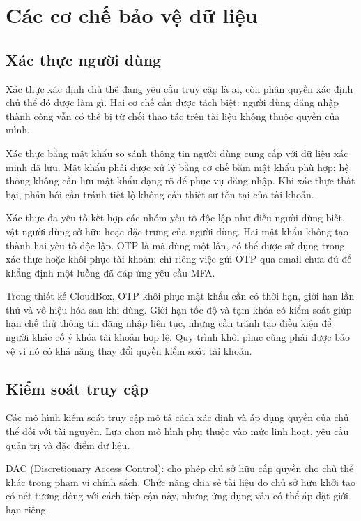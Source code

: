 \section{Các cơ chế bảo vệ dữ liệu}
\subsection{Xác thực người dùng}
Xác thực xác định chủ thể đang yêu cầu truy cập là ai, còn phân quyền xác định chủ thể đó được làm gì. Hai cơ chế cần được tách biệt: người dùng đăng nhập thành công vẫn có thể bị từ chối thao tác trên tài liệu không thuộc quyền của mình.

Xác thực bằng mật khẩu so sánh thông tin người dùng cung cấp với dữ liệu xác minh đã lưu. Mật khẩu phải được xử lý bằng cơ chế băm mật khẩu phù hợp; hệ thống không cần lưu mật khẩu dạng rõ để phục vụ đăng nhập. Khi xác thực thất bại, phản hồi cần tránh tiết lộ không cần thiết sự tồn tại của tài khoản.

Xác thực đa yếu tố kết hợp các nhóm yếu tố độc lập như điều người dùng biết, vật người dùng sở hữu hoặc đặc trưng của người dùng. Hai mật khẩu không tạo thành hai yếu tố độc lập. OTP là mã dùng một lần, có thể được sử dụng trong xác thực hoặc khôi phục tài khoản; chỉ riêng việc gửi OTP qua email chưa đủ để khẳng định một luồng đã đáp ứng yêu cầu MFA.\cite{auth}

Trong thiết kế CloudBox, OTP khôi phục mật khẩu cần có thời hạn, giới hạn lần thử và vô hiệu hóa sau khi dùng. Giới hạn tốc độ và tạm khóa có kiểm soát giúp hạn chế thử thông tin đăng nhập liên tục, nhưng cần tránh tạo điều kiện để người khác cố ý khóa tài khoản hợp lệ. Quy trình khôi phục cũng phải được bảo vệ vì nó có khả năng thay đổi quyền kiểm soát tài khoản.

\subsection{Kiểm soát truy cập}
Các mô hình kiểm soát truy cập mô tả cách xác định và áp dụng quyền của chủ thể đối với tài nguyên. Lựa chọn mô hình phụ thuộc vào mức linh hoạt, yêu cầu quản trị và đặc điểm dữ liệu.

DAC (Discretionary Access Control): cho phép chủ sở hữu cấp quyền cho chủ thể khác trong phạm vi chính sách. Chức năng chia sẻ tài liệu do chủ sở hữu khởi tạo có nét tương đồng với cách tiếp cận này, nhưng ứng dụng vẫn có thể áp đặt giới hạn riêng.

